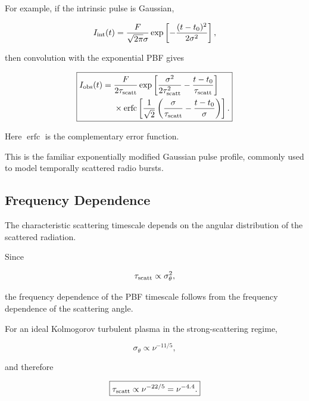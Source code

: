 For example, if the intrinsic pulse is Gaussian,

\begin{equation}
I_{\rm int}(t)
=
\frac{F}{\sqrt{2\pi}\sigma}
\exp\left[
-\frac{(t-t_0)^2}{2\sigma^2}
\right],
\end{equation}

then convolution with the exponential PBF gives

\begin{equation}
\boxed{
\begin{aligned}
I_{\rm obs}(t)
={}&
\frac{F}{2\tau_{\rm scatt}}
\exp\left[
\frac{\sigma^2}{2\tau_{\rm scatt}^2}
-\frac{t-t_0}{\tau_{\rm scatt}}
\right]\\
&\times
\operatorname{erfc}\left[
\frac{1}{\sqrt{2}}
\left(
\frac{\sigma}{\tau_{\rm scatt}}
-\frac{t-t_0}{\sigma}
\right)
\right].
\end{aligned}
}
\end{equation}

Here $\operatorname{erfc}$ is the complementary
error function.

This is the familiar exponentially modified Gaussian
pulse profile, commonly used to model temporally
scattered radio bursts.

\subsection{Frequency Dependence}

The characteristic scattering timescale depends on
the angular distribution of the scattered radiation.

Since

\begin{equation}
\tau_{\rm scatt}\propto\sigma_\theta^2,
\end{equation}

the frequency dependence of the PBF timescale follows
from the frequency dependence of the scattering angle.

For an ideal Kolmogorov turbulent plasma in the
strong-scattering regime,

\begin{equation}
\sigma_\theta\propto\nu^{-11/5},
\end{equation}

and therefore

\begin{equation}
\boxed{
\tau_{\rm scatt}\propto\nu^{-22/5}
=\nu^{-4.4}.
}
\end{equation}

